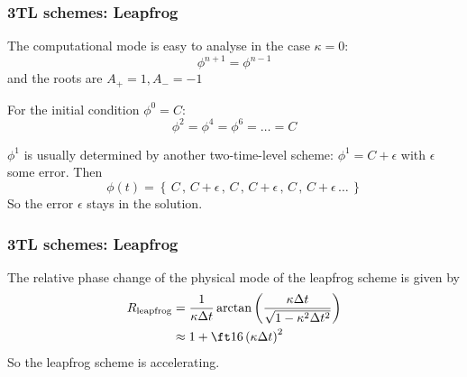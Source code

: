 \documentclass[aspectratio=149,9pt]{beamer}
\begin{document}
%
%
%
\begin{frame}
	\frametitle{3TL schemes: Leapfrog}
	The computational mode is easy to analyse in the case $\kappa = 0$:
	\begin{equation*}
		\phi^{n+1} = \phi^{n-1}
	\end{equation*}
	and the roots are $A_+ = 1, A_- = -1$
	\par
	For the initial condition $\phi^0 = C$:
	\begin{equation*}
		\phi^2 = \phi^4 = \phi^6 = \dots = C
	\end{equation*}
	\par
	$\phi^1$ is usually determined by another two-time-level scheme: $\phi^1 = C + \epsilon$ with $\epsilon$ some error. Then
	\begin{equation*}
		\phi(t) = \left\{\,C\,,\,C+\epsilon\,,\,C\,,\,C+\epsilon\,,\,C\,,\,C+\epsilon\,\ldots\,\right\}
	\end{equation*}
	So the error $\epsilon$ stays in the solution.
\end{frame}
%
%
%
\begin{frame}
	\frametitle{3TL schemes: Leapfrog}
	The relative phase change of the physical mode of the leapfrog scheme is given by
	\begin{align*}
		R_{\text{leapfrog}} &= \frac{1}{\kappa \Delta t} \arctan \left( \frac{\kappa \Delta t}{\sqrt{ 1 - \kappa^2 \Delta t^2 }} \right) \\
		&\approx 1 + \ft16 \left( \kappa \Delta t \right)^2
	\end{align*}
	So the leapfrog scheme is accelerating.
\end{frame}
%
%
\end{document}

